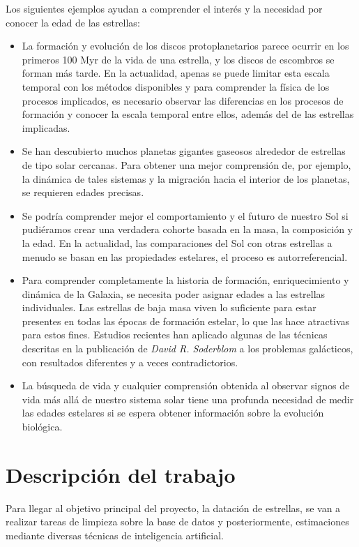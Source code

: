 \documentclass[12pt,oneside,a4paper]{article}
\begin{document}
Los siguientes ejemplos ayudan a comprender el interés y la necesidad por conocer la edad de las estrellas:
\begin{itemize}
\item La formación y evolución de los discos protoplanetarios parece ocurrir en los primeros 100 Myr de la vida de una estrella, y los discos de escombros se forman más tarde. En la actualidad, apenas se puede limitar esta escala temporal con los métodos disponibles y para comprender la física de los procesos implicados, es necesario observar las diferencias en los procesos de formación y conocer la escala temporal entre ellos, además del de las estrellas implicadas.
\item Se han descubierto muchos planetas gigantes gaseosos alrededor de estrellas de tipo solar cercanas. Para obtener una mejor comprensión de, por ejemplo, la dinámica de tales sistemas y la migración hacia el interior de los planetas, se requieren edades precisas.
\item Se podría comprender mejor el comportamiento y el futuro de nuestro Sol si pudiéramos crear una verdadera cohorte basada en la masa, la composición y la edad. En la actualidad, las comparaciones del Sol con otras estrellas a menudo se basan en las propiedades estelares, el proceso es autorreferencial.
\item Para comprender completamente la historia de formación, enriquecimiento y dinámica de la Galaxia, se necesita poder asignar edades a las estrellas individuales. Las estrellas de baja masa viven lo suficiente para estar presentes en todas las épocas de formación estelar, lo que las hace atractivas para estos fines. Estudios recientes han aplicado algunas de las técnicas descritas en la publicación de \textit{David R. Soderblom} a los problemas galácticos, con resultados diferentes y a veces contradictorios.
\item La búsqueda de vida y cualquier comprensión obtenida al observar signos de vida más allá de nuestro sistema solar tiene una profunda necesidad de medir las edades estelares si se espera obtener información sobre la evolución biológica.
\end{itemize}

\section{Descripción del trabajo}
Para llegar al objetivo principal del proyecto, la datación de estrellas, se van a realizar tareas de limpieza sobre la base de datos y posteriormente, estimaciones mediante diversas técnicas de inteligencia artificial.
\end{document}
